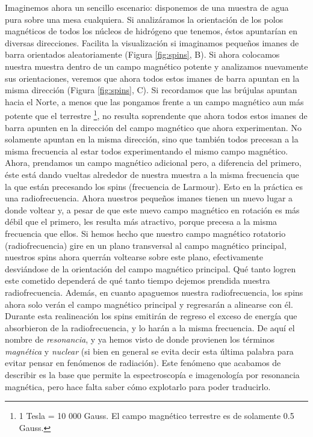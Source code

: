Imaginemos ahora un sencillo escenario: disponemos de una muestra de agua pura sobre una mesa cualquiera. Si analizáramos la orientación de los polos magnéticos de todos los núcleos de hidrógeno que tenemos, éstos apuntarían en diversas direcciones. Facilita la visualización si imaginamos pequeños imanes de barra orientados aleatoriamente (Figura \ref{fig:spins}, B). Si ahora colocamos nuestra muestra dentro de un campo magnético potente y analizamos nuevamente sus orientaciones, veremos que ahora todos estos imanes de barra apuntan en la misma dirección (Figura \ref{fig:spins}, C). Si recordamos que las brújulas apuntan hacia el Norte, a menos que las pongamos frente a un campo magnético aun más potente que el terrestre \footnote{1 Tesla = 10 000 Gauss. El campo magnético terrestre es de solamente 0.5 Gauss.}, no resulta soprendente que ahora todos estos imanes de barra apunten en la dirección del campo magnético que ahora experimentan. No solamente apuntan en la misma dirección, sino que también todos precesan a la misma frecuencia al estar todos experimentando el mismo campo magnético. Ahora, prendamos un campo magnético adicional pero, a diferencia del primero, éste está dando vueltas alrededor de nuestra muestra a la misma frecuencia que la que están precesando los spins (frecuencia de Larmour). Esto en la práctica es una radiofrecuencia.  Ahora nuestros pequeños imanes tienen un nuevo lugar a donde voltear y, a pesar de que este nuevo campo magnético en rotación es más débil que el primero, les resulta más atractivo, porque precesa a la misma frecuencia que ellos. Si hemos hecho que nuestro campo magnético rotatorio (radiofrecuencia) gire en un plano transversal al campo magnético principal, nuestros spins ahora querrán voltearse sobre este plano, efectivamente desviándose de la orientación del campo magnético principal. Qué tanto logren este cometido dependerá de qué tanto tiempo dejemos prendida nuestra radiofrecuencia. Además, en cuanto apaguemos nuestra radiofrecuencia, los spins ahora solo verán el campo magnético principal y regresarán a alinearse con él. Durante esta realineación los spins emitirán de regreso el exceso de energía que absorbieron de la radiofrecuencia, y lo harán a la misma frecuencia. De aquí el nombre de \emph{resonancia}, y ya hemos visto de donde provienen los términos \emph{magnética} y \emph{nuclear} (si bien en general se evita decir esta última palabra para evitar pensar en fenómenos de radiación). Este fenómeno que acabamos de describir es la base que permite la espectroscopía e imagenología por resonancia magnética, pero hace falta saber cómo explotarlo para poder traducirlo.



